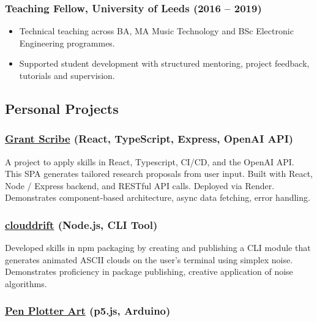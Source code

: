 \documentclass[10pt,a4paper]{article}
\providecommand{\tightlist}{%
  \setlength{\itemsep}{0pt}\setlength{\parskip}{0pt}}
\begin{document}
\subsubsection{Teaching Fellow, University of Leeds (2016 --
2019)}\label{teaching-fellow-university-of-leeds-2016-2019}

\begin{itemize}
\tightlist
\item
  Technical teaching across BA, MA Music Technology and BSc Electronic
  Engineering programmes.
\item
  Supported student development with structured mentoring, project
  feedback, tutorials and supervision.
\end{itemize}

\subsection{Personal Projects}\label{personal-projects}

\subsubsection{\texorpdfstring{\href{https://granter.onrender.com/}{Grant
Scribe} (React, TypeScript, Express, OpenAI
API)}{Grant Scribe (React, TypeScript, Express, OpenAI API)}}\label{grant-scribe-react-typescript-express-openai-api}

A project to apply skills in React, Typescript, CI/CD, and the OpenAI
API. This SPA generates tailored research proposals from user input.
Built with React, Node / Express backend, and RESTful API calls.
Deployed via Render. Demonstrates component-based architecture, async
data fetching, error handling.

\subsubsection{\texorpdfstring{\href{https://github.com/thrly/clouddrift}{clouddrift}
(Node.js, CLI
Tool)}{clouddrift (Node.js, CLI Tool)}}\label{clouddrift-node.js-cli-tool}

Developed skills in npm packaging by creating and publishing a CLI
module that generates animated ASCII clouds on the user's terminal using
simplex noise. Demonstrates proficiency in package publishing, creative
application of noise algorithms.

\subsubsection{\texorpdfstring{\href{https://github.com/thrly/pen-plotter-resources}{Pen
Plotter Art} (p5.js,
Arduino)}{Pen Plotter Art (p5.js, Arduino)}}\label{pen-plotter-art-p5.js-arduino}
\end{document}
